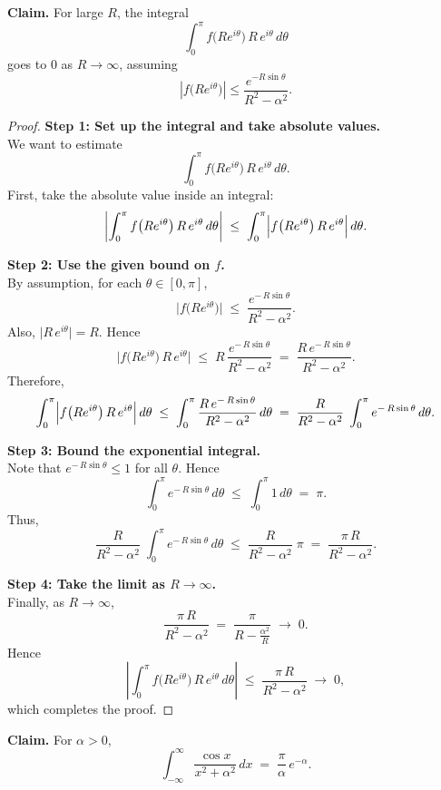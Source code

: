 \documentclass[12pt]{article}
\theoremstyle{definition} %
\theoremstyle{plain} %
\begin{document}
\noindent
\textbf{Claim.} For large \(R\), the integral
\[
\int_{0}^{\pi} f\bigl(Re^{i\theta}\bigr)\,R\,e^{i\theta}\,d\theta
\]
goes to \(0\) as \(R \to \infty\), assuming 
\[
\left|f\bigl(Re^{i\theta}\bigr)\right| \le \frac{e^{-R\sin\theta}}{R^2 - \alpha^2}.
\]

\begin{proof}

\textbf{Step 1: Set up the integral and take absolute values.}\\
We want to estimate 
\[
\int_{0}^{\pi} f\bigl(Re^{i\theta}\bigr)\,R\,e^{i\theta}\,d\theta.
\]
First, take the absolute value inside an integral:
\[
\left|
\int_{0}^{\pi} f\bigl(Re^{i\theta}\bigr)\,R\,e^{i\theta}\,d\theta
\right|
\;\le\;
\int_{0}^{\pi}
\Bigl| f\bigl(Re^{i\theta}\bigr)\,R\,e^{i\theta}\Bigr|
\,d\theta.
\]

\textbf{Step 2: Use the given bound on \(f\).}\\
By assumption, for each \(\theta \in [0,\pi]\),
\[
\bigl|f\bigl(Re^{i\theta}\bigr)\bigr|
\;\le\;
\frac{e^{-\,R\sin\theta}}{R^{2}-\alpha^{2}}.
\]
Also, \(\bigl|R\,e^{i\theta}\bigr| = R\). Hence
\[
\bigl|
f\bigl(Re^{i\theta}\bigr)\,R\,e^{i\theta}
\bigr|
\;\le\;
R \,\frac{e^{-\,R\sin\theta}}{R^{2}-\alpha^{2}}
\;=\;
\frac{R\, e^{-\,R\sin\theta}}{R^{2}-\alpha^{2}}.
\]
Therefore,
\[
\int_{0}^{\pi}
\Bigl| f\bigl(Re^{i\theta}\bigr)\,R\,e^{i\theta}\Bigr|
\,d\theta
\;\le\;
\int_{0}^{\pi}
\frac{R\, e^{-\,R\sin\theta}}{R^{2}-\alpha^{2}}
\,d\theta
\;=\;
\frac{R}{R^{2}-\alpha^{2}}
\;\int_{0}^{\pi}
e^{-\,R\sin\theta}\,d\theta.
\]

\textbf{Step 3: Bound the exponential integral.}\\
Note that \(e^{-\,R\sin\theta} \le 1\) for all \(\theta\). Hence
\[
\int_{0}^{\pi} e^{-\,R\sin\theta}\,d\theta
\;\le\;
\int_{0}^{\pi} 1\,d\theta 
\;=\; \pi.
\]
Thus,
\[
\frac{R}{R^{2}-\alpha^{2}}
\;\int_{0}^{\pi}
e^{-\,R\sin\theta}\,d\theta
\;\le\;
\frac{R}{R^{2}-\alpha^{2}}
\;\pi
\;=\;
\frac{\pi\,R}{R^{2}-\alpha^{2}}.
\]

\textbf{Step 4: Take the limit as \(R \to \infty\).}\\
Finally, as \(R \to \infty\),
\[
\frac{\pi\,R}{R^{2}-\alpha^{2}}
\;=\;
\frac{\pi}{R - \frac{\alpha^{2}}{R}}
\;\longrightarrow\; 0.
\]
Hence
\[
\left|
\int_{0}^{\pi} f\bigl(Re^{i\theta}\bigr)\,R\,e^{i\theta}\,d\theta
\right|
\;\le\;
\frac{\pi\,R}{R^{2}-\alpha^{2}}
\;\longrightarrow\;
0,
\]
which completes the proof.
\end{proof}

\noindent
\textbf{Claim.} For $\alpha>0$,
\[
\int_{-\infty}^{\infty} \frac{\cos x}{x^2 + \alpha^2}\,dx
\;=\;\frac{\pi}{\alpha}\,e^{-\alpha}.
\]
\end{document}
